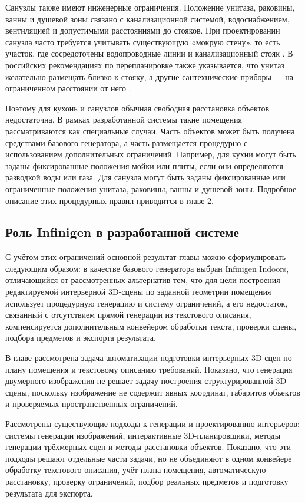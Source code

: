 \documentclass[times]{itmo-student-thesis}
\begin{document}
Санузлы также имеют инженерные ограничения. Положение унитаза, раковины, ванны и душевой зоны связано с канализационной системой, водоснабжением, вентиляцией и допустимыми расстояниями до стояков. При проектировании санузла часто требуется учитывать существующую «мокрую стену», то есть участок, где сосредоточены водопроводные линии и канализационный стояк \cite{bhgBathroomPlumbing}. В российских рекомендациях по перепланировке также указывается, что унитаз желательно размещать близко к стояку, а другие сантехнические приборы — на ограниченном расстоянии от него \cite{sanuzelserviceBathroomRules}.

Поэтому для кухонь и санузлов обычная свободная расстановка объектов недостаточна. В рамках разработанной системы такие помещения рассматриваются как специальные случаи. Часть объектов может быть получена средствами базового генератора, а часть размещается процедурно с использованием дополнительных ограничений. Например, для кухни могут быть заданы фиксированные положения мойки или плиты, если они определяются разводкой воды или газа. Для санузла могут быть заданы фиксированные или ограниченные положения унитаза, раковины, ванны и душевой зоны. Подробное описание этих процедурных правил приводится в главе 2.

\subsection{Роль Infinigen в разработанной системе}

С учётом этих ограничений основной результат главы можно сформулировать следующим образом: в качестве базового генератора выбран Infinigen Indoors, отличающийся от рассмотренных альтернатив тем, что для цели построения редактируемой интерьерной 3D-сцены по заданной геометрии помещения использует процедурную генерацию и систему ограничений, а его недостаток, связанный с отсутствием прямой генерации из текстового описания, компенсируется дополнительным конвейером обработки текста, проверки сцены, подбора предметов и экспорта результата.

\chapterconclusion

В главе рассмотрена задача автоматизации подготовки интерьерных 3D-сцен по плану помещения и текстовому описанию требований. Показано, что генерация двумерного изображения не решает задачу построения структурированной 3D-сцены, поскольку изображение не содержит явных координат, габаритов объектов и проверяемых пространственных ограничений.

Рассмотрены существующие подходы к генерации и проектированию интерьеров: системы генерации изображений, интерактивные 3D-планировщики, методы генерации трёхмерных сцен и методы расстановки объектов. Показано, что эти подходы решают отдельные части задачи, но не объединяют в одном конвейере обработку текстового описания, учёт плана помещения, автоматическую расстановку, проверку ограничений, подбор реальных предметов и подготовку результата для экспорта.
\end{document}
